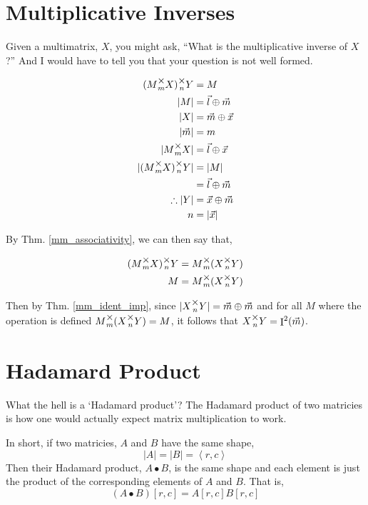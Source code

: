 \documentclass[12pt]{book}
\theoremstyle{plain}
\theoremstyle{definition}
\theoremstyle{ppart}
\theoremstyle{case}
\theoremstyle{solution}
\DeclareMathOperator{\Ident}{I}
\newcommand{\mmult}[1]{\text{\raisebox{1ex}{$\underset{#1}{\times}$}}}
\begin{document}
\section{Multiplicative Inverses}

Given a multimatrix, $X$, you might ask, ``What is the multiplicative inverse of $X$?''
And I would have to tell you that your question is not well formed.

\begin{align*}
  (M \mmult{m} X) \mmult{n} Y &= M \\
  |M| &= \vec{l} \oplus \vec{m} \\
  |X| &= \vec{m} \oplus \vec{x} \\
  |\vec{m}| &= m \\
  |M \mmult{m} X| &= \vec{l} \oplus \vec{x} \\
  |(M \mmult{m} X) \mmult{n} Y| &= |M| \\
  &= \vec{l} \oplus \vec{m} \\
  \therefore |Y| &= \vec{x} \oplus \vec{m} \\
  n &= |\vec{x}|
\end{align*}

By Thm. \ref{mm_associativity}, we can then say that,

\begin{align*}
  (M \mmult{m} X) \mmult{n} Y &= M \mmult{m} (X \mmult{n} Y) \\
  M &= M \mmult{m} (X \mmult{n} Y)
\end{align*}

Then by Thm. \ref{mm_ident_imp}, since $|X \mmult{n} Y| = \vec{m} \oplus \vec{m}$ and for all
$M$ where the operation is defined $M \mmult{m} (X \mmult{n} Y) = M$, it follows that
$X \mmult{n} Y = \Ident^2(\vec{m})$.
 


\section{Hadamard Product}

What the hell is a `Hadamard product'? The Hadamard product \cite{wiki:hadamard}
of two matricies is how one would actually expect matrix multiplication to work.

In short, if two matricies, $A$ and $B$ have the same shape,
\[ |A| = |B| = \left<r,c\right> \]
Then their Hadamard product, $A \bullet B$, is the same shape and each element
is just the product of the corresponding elements of $A$ and $B$. That is,
\[ (A \bullet B)[r,c] = A[r,c] B[r,c] \]
\end{document}
